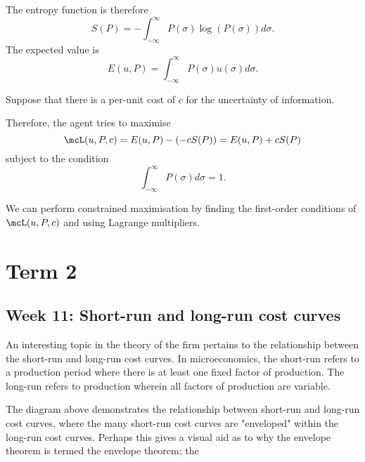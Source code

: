 \documentclass[a4paper, 12pt,oneside,openany]{book}
\begin{document}
The entropy function is therefore $$S(P) = -\int_{-\infty}^\infty P(\sigma) \log(P(\sigma)) d\sigma.$$ The expected value is $$E(u, P) = \int_{-\infty}^\infty P(\sigma)u(\sigma) d\sigma.$$ 

Suppose that there is a per-unit cost of $c$ for the uncertainty of information. 

Therefore, the agent tries to maximise $$\mcL(u, P, c) = E(u, P) -(-cS(P))=E(u, P)+cS(P)$$ subject to the condition $$\int_{-\infty}^\infty P(\sigma) d\sigma=1.$$

We can perform constrained maximisation by finding the first-order conditions of $\mcL(u, P, c)$ and using Lagrange multipliers.

\section{Term 2}

\subsection{Week 11: Short-run and long-run cost curves}

An interesting topic in the theory of the firm pertains to the relationship between the short-run and long-run cost curves. In microeconomics, the short-run refers to a production period where there is at least one fixed factor of production. The long-run refers to production wherein all factors of production are variable. 


The diagram above demonstrates the relationship between short-run and long-run cost curves, where the many short-run cost curves are "enveloped" within the long-run cost curves. Perhaps this gives a visual aid as to why the envelope theorem is termed the envelope theorem; the 
\end{document}
